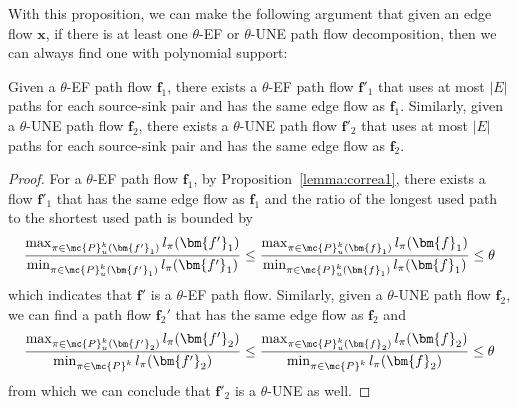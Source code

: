 With this proposition, we can make the following argument that given an edge flow $\bm{x}$, if there is at least one $\theta$-EF or $\theta$-UNE path flow decomposition, then we can always find one with %
polynomial support:
\begin{lemma}\label{thm:npproblems}
	Given a $\theta$-EF path flow $\bm{f}_1$, there exists a $\theta$-EF path flow $\bm{f}'_1$ that uses at most $|E|$ paths for each source-sink pair and has the same edge flow as $\bm{f}_1$.  Similarly, given a $\theta$-UNE path flow $\bm{f}_2$, there exists a $\theta$-UNE path flow $\bm{f}'_2$ that uses at most $|E|$ paths for each source-sink pair and has the same edge flow as $\bm{f}_2$.
\end{lemma}
\begin{proof}
	For a $\theta$-EF path flow $\bm{f}_1$, by Proposition~\ref{lemma:correa1}, there exists a flow $\bm{f}'_1$ that has the same edge flow as $\bm{f}_1$ and the ratio of the longest used path to the shortest used path is bounded by
	$$
	\frac{\max_{\pi \in \mc{P}_u^k(\bm{f'}_1)} l_{\pi}(\bm{f'}_1)}{\min_{\pi \in \mc{P}_u^k(\bm{f'}_1)} l_{\pi}(\bm{f'}_1)} \le \frac{\max_{\pi \in \mc{P}_u^k(\bm{f}_1)} l_{\pi}(\bm{f}_1)}{\min_{\pi \in \mc{P}_u^k(\bm{f}_1)} l_{\pi}(\bm{f}_1)} \le \theta
	$$
	which indicates that $\bm{f}'$ is a $\theta$-EF path flow.  Similarly, given a $\theta$-UNE path flow $\bm{f}_2$, we can find a path flow $\bm{f}_2'$ that has the same edge flow as $\bm{f}_2$ and 
	$$
	\frac{\max_{\pi \in \mc{P}_u^k(\bm{f'}_2)} l_{\pi}(\bm{f'}_2)}{\min_{\pi \in \mc{P}^k} l_{\pi}(\bm{f'}_2)} \le \frac{\max_{\pi \in \mc{P}_u^k(\bm{f}_2)} l_{\pi}(\bm{f}_2)}{\min_{\pi \in \mc{P}^k} l_{\pi}(\bm{f}_2)} \le \theta
	$$
	from which we can conclude that $\bm{f}'_2$ is a $\theta$-UNE as well. 
\end{proof}
